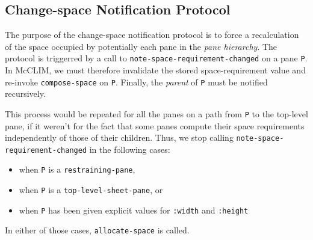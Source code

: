 \subsection{Change-space Notification Protocol}

The purpose of the change-space notification protocol is to force a
recalculation of the space occupied by potentially each pane in the
\emph{pane hierarchy}.  The protocol is triggerred by a call to
\texttt{note-space-requirement-changed} on a pane \texttt{P}. In McCLIM, we
must therefore invalidate the stored space-requirement value and
re-invoke \texttt{compose-space} on \texttt{P}.  Finally, the
\emph{parent} of \texttt{P} must be notified recursively.

This process would be repeated for all the panes on a path from \texttt{P}
to the top-level pane, if it weren't for the fact that some panes
compute their space requirements independently of those of their
children.  Thus, we stop calling \texttt{note-space-requirement-changed}
in the following cases:

\begin{itemize}
\item
 when \texttt{P} is a \texttt{restraining-pane},
\item
 when \texttt{P} is a \texttt{top-level-sheet-pane}, or
\item
 when \texttt{P} has been given explicit values for \texttt{:width} and
  \texttt{:height}
\end{itemize}

In either of those cases, \texttt{allocate-space} is called.
